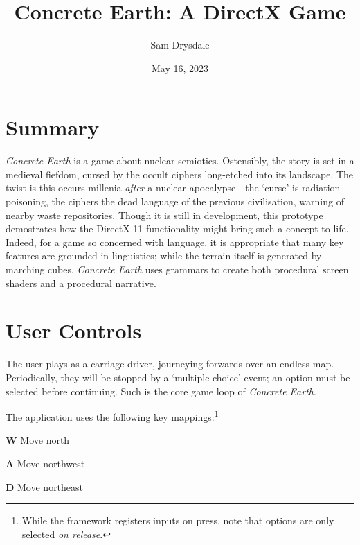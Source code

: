 \documentclass[a4paper, 11pt]{article}
\title{Concrete Earth: A DirectX Game}
\author{Sam Drysdale}
\date{May 16, 2023}
\begin{document}
\graphicspath{{./Images/}}
\maketitle
\tableofcontents
\begin{flushleft}

\section{Summary}

\textit{Concrete Earth} is a game about nuclear semiotics. Ostensibly, the story is set in a medieval fiefdom, cursed by the occult ciphers long-etched into its landscape. The twist is this occurs millenia \textit{after} a nuclear apocalypse - the `curse' is radiation poisoning, the ciphers the dead language of the previous civilisation, warning of nearby waste repositories. Though it is still in development, this prototype demostrates how the DirectX 11 functionality might bring such a concept to life. Indeed, for a game so concerned with language, it is appropriate that many key features are grounded in linguistics; while the terrain itself is generated by marching cubes, \textit{Concrete Earth} uses grammars to create both procedural screen shaders and a procedural narrative.



\newpage
\section{User Controls}

The user plays as a carriage driver, journeying forwards over an endless map. Periodically, they will be stopped by a `multiple-choice' event; an option must be selected before continuing. Such is the core game loop of \textit{Concrete Earth}.

\vspace{5pt}\noindent
The application uses the following key mappings:\footnote{While the framework registers inputs on press, note that options are only selected \textit{on release}.}

\begin{center}
\parbox[t]{0.75\textwidth}{
\vspace{0pt}\noindent 
\textbf{W} \dotfill{} Move north

\vspace{2.5pt}\noindent 
\textbf{A} \dotfill{} Move northwest

\vspace{2.5pt}\noindent 
\textbf{D} \dotfill{} Move northeast

}
\end{center}
\end{flushleft}
\end{document}
